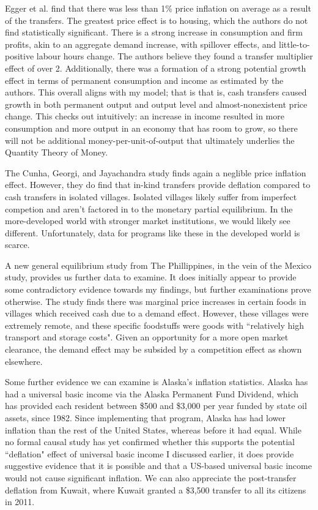 \documentclass[paper=a4, fontsize=11pt,twoside]{scrartcl}
\begin{document}
Egger et al. find that there was less than 1\% price inflation on average as a result of the transfers. The greatest price effect is to housing, which the authors do not find statistically significant. There is a strong increase in consumption and firm profits, akin to an aggregate demand increase, with spillover effects, and little-to-positive labour hours change. The authors believe they found a transfer multiplier effect of over 2. Additionally, there was a formation of a strong potential growth effect in terms of permanent consumption and income as estimated by the authors. This overall aligns with my model; that is that is, cash transfers caused growth in both permanent output and output level and almost-nonexistent price change. This checks out intuitively: an increase in income resulted in more consumption and more output in an economy that has room to grow, so there will not be additional money-per-unit-of-output that ultimately underlies the Quantity Theory of Money.

The Cunha, Georgi, and Jayachandra study finds again a neglible price inflation effect. However, they do find that in-kind transfers provide deflation compared to cash transfers in isolated villages. Isolated villages likely suffer from imperfect competion and aren't factored in to the monetary partial equilibrium. In the more-developed world with stronger market institutions, we would likely see different. Unfortunately, data for programs like these in the developed world is scarce. 

A new general equilibrium study from The Phillippines\autocite{10.1162/rest_a_01061}, in the vein of the Mexico study, provides us further data to examine. It does initially appear to provide some contradictory evidence towards my findings, but further examinations prove otherwise. The study finds there was marginal price increases in certain foods in villages which received cash due to a demand effect. However, these villages were extremely remote, and these specific foodstuffs were goods with ``relatively high transport and storage costs". Given an opportunity for a more open market clearance, the demand effect may be subsided by a competition effect as shown elsewhere. 

Some further evidence we can examine\autocite{santens} is Alaska's inflation statistics. Alaska has had a universal basic income via the Alaska Permanent Fund Dividend, which has provided each resident between \$500 and \$3,000 per year funded by state oil assets, since 1982. Since implementing that program, Alaska has had lower inflation than the rest of the United States\autocite{fred1}, whereas before it had equal. While no formal causal study has yet confirmed whether this supports the potential ``deflation" effect of universal basic income I discussed earlier, it does provide suggestive evidence that it is possible and that a US-based universal basic income would not cause significant inflation. We can also appreciate the post-transfer deflation from Kuwait\autocite{imf1}, where Kuwait granted a \$3,500 transfer to all its citizens in 2011\autocite{imfkuw}.
\end{document}
